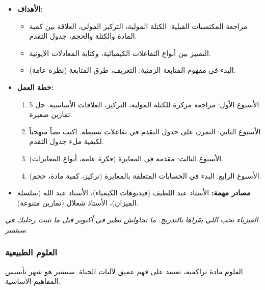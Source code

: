\documentclass[12pt,a4paper]{book}
\newcommand{\quoteAr}[1]{%
	\begin{myquote}
		\itshape #1
	\end{myquote}
}
\begin{document}
	\begin{itemize}
		\item \textbf{الأهداف:}
		\begin{itemize}
			\item مراجعة المكتسبات القبلية: الكتلة المولية، التركيز المولي، العلاقة بين كمية المادة والكتلة والحجم، جدول التقدم.
			\item التمييز بين أنواع التفاعلات الكيميائية، وكتابة المعادلات الأيونية.
			\item البدء في مفهوم المتابعة الزمنية: التعريف، طرق المتابعة (نظرة عامة).
		\end{itemize}
		\item \textbf{خطة العمل:}
		\begin{enumerate}
			\item الأسبوع الأول: مراجعة مركزة للكتلة المولية، التركيز، العلاقات الأساسية. حل 5 تمارين صغيرة.
			\item الأسبوع الثاني: التمرن على جدول التقدم في تفاعلات بسيطة. اكتب نصاً منهجياً لكيفية ملء جدول التقدم.
			\item الأسبوع الثالث: مقدمة في المعايرة (فكرة عامة، أنواع المعايرات).
			\item الأسبوع الرابع: البدء في الحسابات المتعلقة بالمعايرة (تركيز، كمية مادة، حجم).
		\end{enumerate}
		\item \textbf{مصادر مهمة:} الأستاذ عبد اللطيف (فيديوهات الكيمياء)، الأستاذ عبد الله (سلسلة الميزان)، الأستاذ شعلال (تمارين متنوعة).
	\end{itemize}
	
	\quoteAr{الفيزياء تحب اللي يقراها بالتدريج. ما تحاولش تطير في أكتوبر قبل ما تثبت رجليك في سبتمبر.}
	
	\subsubsection{العلوم الطبيعية}
	
	العلوم مادة تراكمية، تعتمد على فهم عميق لآليات الحياة. سبتمبر هو شهر تأسيس المفاهيم الأساسية.
	
\end{document}
